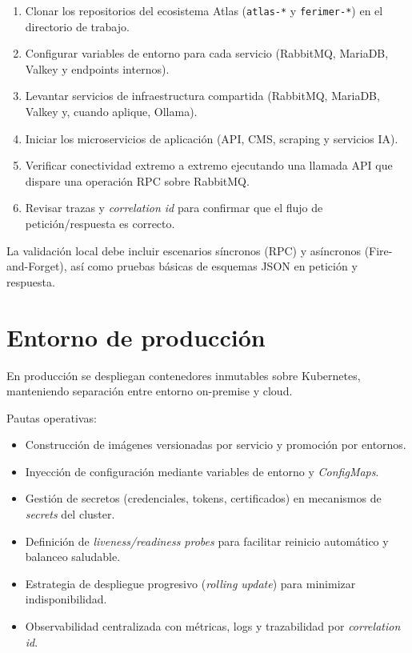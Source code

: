 \begin{enumerate}
\item Clonar los repositorios del ecosistema Atlas (\texttt{atlas-*} y \texttt{ferimer-*}) en el directorio de trabajo.
\item Configurar variables de entorno para cada servicio (RabbitMQ, MariaDB, Valkey y endpoints internos).
\item Levantar servicios de infraestructura compartida (RabbitMQ, MariaDB, Valkey y, cuando aplique, Ollama).
\item Iniciar los microservicios de aplicación (API, CMS, scraping y servicios IA).
\item Verificar conectividad extremo a extremo ejecutando una llamada API que dispare una operación RPC sobre RabbitMQ.
\item Revisar trazas y \textit{correlation id} para confirmar que el flujo de petición/respuesta es correcto.
\end{enumerate}

La validación local debe incluir escenarios síncronos (RPC) y asíncronos (Fire-and-Forget), así como pruebas básicas de esquemas JSON en petición y respuesta.

\section{Entorno de producción}

En producción se despliegan contenedores inmutables sobre Kubernetes, manteniendo separación entre entorno on-premise y cloud.

Pautas operativas:

\begin{itemize}
\item Construcción de imágenes versionadas por servicio y promoción por entornos.
\item Inyección de configuración mediante variables de entorno y \textit{ConfigMaps}.
\item Gestión de secretos (credenciales, tokens, certificados) en mecanismos de \textit{secrets} del cluster.
\item Definición de \textit{liveness/readiness probes} para facilitar reinicio automático y balanceo saludable.
\item Estrategia de despliegue progresivo (\textit{rolling update}) para minimizar indisponibilidad.
\item Observabilidad centralizada con métricas, logs y trazabilidad por \textit{correlation id}.
\end{itemize}

